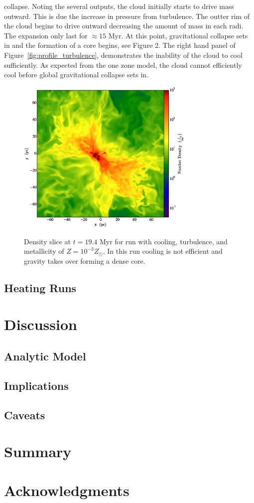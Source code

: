 \documentclass[useAMS,usenatbib]{mn2e}
\begin{document}
collapse. Noting the several outputs, the cloud initially starts to drive mass
outward. This is due the increase in pressure from turbulence. The outter rim
of the cloud begins to drive outward decreasing the amount of mass in each radi.
The expansion only last for $\approx 15$ Myr. At this point, gravitational
collapse sets in and the formation of a core begins, see Figure 2. The right
hand panel of Figure~\ref{fig:profile_turbulence}, demonstrates the inability of the cloud to cool
sufficiently. As expected from the one zone model, the cloud cannot efficiently
cool before global gravitational collapse sets in.
\begin{figure}
\begin{center}
\mbox{\includegraphics[width=8.5cm]{Images/density_slice}}
\end{center}
\caption{\label{fig:slice_turbulence}} Density slice at $t=19.4$ Myr for run with
cooling, turbulence, and metallicity of $Z=10^{-3}Z_\odot$. In this run cooling is
not efficient and gravity takes over forming a dense core. 
\end{figure}

 
\subsection{Heating Runs}

% 
\section{Discussion}
\label{sec:discussion}
\subsection{Analytic Model}
\subsection{Implications}
\subsection{Caveats}

% 
\section{Summary}

% 
\section*{Acknowledgments}

%
\end{document}
